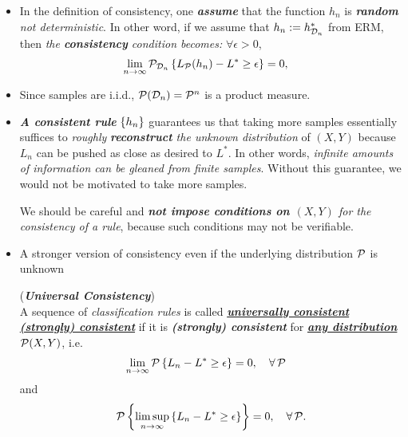 \documentclass[11pt]{article}
\begin{document}
\begin{itemize}
\item \begin{remark}
In the definition of consistency, one \emph{\textbf{assume}} that the function $h_n$ is \emph{\textbf{random}} \emph{not deterministic}. In other word, if we assume that $h_n := h_{{\mathcal D}_n}^{*}$ from ERM, then \emph{the \textbf{consistency} condition becomes:} $\forall \epsilon >0$,
\begin{align*}
\lim\limits_{n\rightarrow \infty}{\mathcal P}_{{\mathcal D}_n}\left\{ L_{{\mathcal P}}(h_n)  - L^{*}\ge \epsilon\right\}&= 0, 
\end{align*}
\end{remark}

\item \begin{remark}
Since samples are i.i.d., ${\mathcal P}({\mathcal D}_n) = {\mathcal P}^n$ is a product measure.
\end{remark}


\item \begin{remark}
\emph{\textbf{A consistent rule}} $\left\{h_n\right\}$ guarantees us that taking more samples essentially suffices to \emph{roughly} \emph{\textbf{reconstruct} the unknown distribution} of $(X, Y)$ because $L_n$ can be pushed as close as desired to $L^{*}$. In other words, \emph{infinite amounts of information can be gleaned from finite samples}. Without this guarantee, we would not be motivated to take more samples. 

We should be careful and \emph{\textbf{not impose conditions on $(X, Y)$} for the consistency of a rule}, because such conditions may not be verifiable. 
\end{remark}


\item A stronger version of consistency even if  the underlying distribution ${\mathcal P}$ is unknown
\begin{definition} (\emph{\textbf{Universal Consistency}})\\
A sequence of \emph{classification rules} is called \underline{\emph{\textbf{universally consistent (strongly) consistent}}} if it is \emph{\textbf{(strongly) consistent}} for \underline{\emph{\textbf{any distribution}}} ${\mathcal P}(X,Y)$, i.e. 
\begin{align*}
\lim\limits_{n\rightarrow \infty}{\mathcal P}\left\{ L_{n}  - L^{*}\ge \epsilon \right\}&= 0, \quad \forall\, {\mathcal P} 
\end{align*}
and 
\begin{align*}
{\mathcal P}\left\{ \limsup\limits_{n\rightarrow \infty}\left\{L_{n} - L^{*}\ge \epsilon \right\}\right\} = 0, \quad \forall\, {\mathcal P}.
\end{align*}
\end{definition}


\end{itemize}
\end{document}
